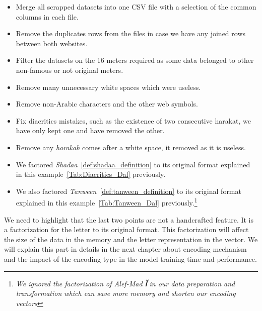 \begin{enumerate}
  \begin{itemize}
    \item Merge all scrapped datasets into one CSV file with a selection of the common columns in each file.
    \item Remove the duplicates rows from the files in case we have any joined rows between both websites.
    \item Filter the datasets on the 16 meters required as some data belonged to other non-famous or not original meters.
    \item Remove many unnecessary white spaces which were useless.
    \item Remove non-Arabic characters and the other web symbols.
    \item Fix diacritics mistakes, such as the existence of two consecutive harakat, we have only kept one and have removed the other. %
    \item Remove any \textit{harakah} comes after a white space, it removed as it is useless. %
    \item We factored \textit{Shadaa}~\ref{def:shadaa_definition} to its original format explained in this example~\ref{Tab:Diacritics_Dal} previously.
    \item We also factored \textit{Tanween}~\ref{def:tanween_definition} to its original format explained in this example~\ref{Tab:Tanween_Dal} previously.\footnote{\textit{We ignored the factorization of Alef-Mad  \textbf{\textarabic{ آ }} in our data preparation and transformation which can save more memory and shorten our encoding vectors}}
  \end{itemize}

  We need to highlight that the last two points are not a handcrafted feature. It is a factorization for the letter to its original format. This factorization will affect the size of the data in the memory and the letter representation in the vector. We will explain this part in details in the next chapter about encoding mechanism and the impact of the encoding type in the model training time and performance.


\end{enumerate}
